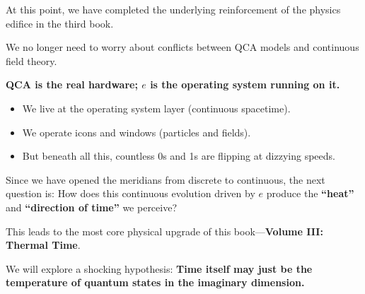 At this point, we have completed the underlying reinforcement of the physics edifice in the third book.

We no longer need to worry about conflicts between QCA models and continuous field theory.

\textbf{QCA is the real hardware; $e$ is the operating system running on it.}

\begin{itemize}
\item We live at the operating system layer (continuous spacetime).

\item We operate icons and windows (particles and fields).

\item But beneath all this, countless 0s and 1s are flipping at dizzying speeds.
\end{itemize}

Since we have opened the meridians from discrete to continuous, the next question is: How does this continuous evolution driven by $e$ produce the \textbf{``heat''} and \textbf{``direction of time''} we perceive?

This leads to the most core physical upgrade of this book---\textbf{Volume III: Thermal Time}.

We will explore a shocking hypothesis: \textbf{Time itself may just be the temperature of quantum states in the imaginary dimension.}

